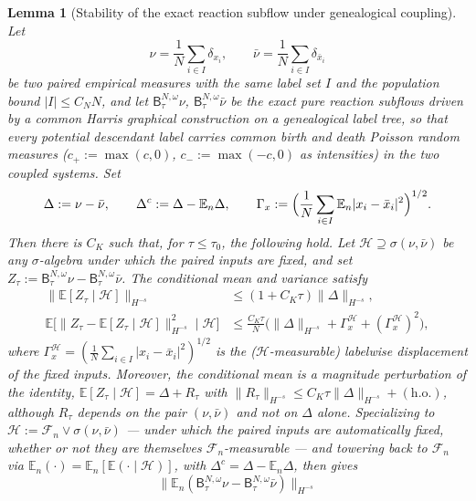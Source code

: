 \documentclass[a4paper,fleqn]{cas-sc}
\newtheorem{lemma}[theorem]{Lemma}
\theoremstyle{definition}
\theoremstyle{remark}
\begin{document}
\begin{lemma}[Stability of the exact reaction subflow under genealogical coupling]\label{lem:Bstab}
Let
\[
\nu=\frac1N\sum_{i\in I}\delta_{x_i},
\qquad
\bar\nu=\frac1N\sum_{i\in I}\delta_{\bar x_i}
\]
be two paired empirical measures with the same label set $I$ and the population
bound $|I|\le C_NN$, and let $\mathsf B^{N,\omega}_\tau\nu$,
$\mathsf B^{N,\omega}_\tau\bar\nu$ be the exact pure reaction subflows driven by a
common Harris graphical construction on a genealogical label tree, so that every
potential descendant label carries common birth and death Poisson random measures
($c_+:=\max(c,0)$, $c_-:=\max(-c,0)$ as intensities) in the two coupled systems.
Set
\[
\Delta:=\nu-\bar\nu,\qquad
\Delta^c:=\Delta-\mathbb E_n\Delta,
\qquad
\Gamma_x:=\Bigl(\frac1N\sum_{i\in I}\mathbb E_n|x_i-\bar x_i|^2\Bigr)^{1/2}.
\]
Then there is $C_K$ such that, for $\tau\le\tau_0$, the following hold. Let
$\mathcal H\supseteq\sigma(\nu,\bar\nu)$ be any $\sigma$-algebra under which the
paired inputs are fixed, and set $Z_\tau:=\mathsf B^{N,\omega}_\tau\nu
-\mathsf B^{N,\omega}_\tau\bar\nu$. The conditional mean and variance satisfy
\begin{align}
\bigl\|\mathbb E[Z_\tau\mid\mathcal H]\bigr\|_{H^{-s}}
&\le (1+C_K\tau)\|\Delta\|_{H^{-s}},
\label{eq:Bstab-cond-mean}\\
\mathbb E\bigl[\|Z_\tau-\mathbb E[Z_\tau\mid\mathcal H]\|_{H^{-s}}^2\mid\mathcal H\bigr]
&\le\frac{C_K\tau}{N}\bigl(\|\Delta\|_{H^{-s}}+\Gamma_x^{\mathcal H}+(\Gamma_x^{\mathcal H})^2\bigr),
\label{eq:Bstab-cond-var}
\end{align}
where $\Gamma_x^{\mathcal H}=(\frac1N\sum_{i\in I}|x_i-\bar x_i|^2)^{1/2}$ is the
($\mathcal H$-measurable) labelwise displacement of the fixed inputs. Moreover, the
conditional mean is a magnitude perturbation of the identity,
$\mathbb E[Z_\tau\mid\mathcal H]=\Delta+R_\tau$ with
$\|R_\tau\|_{H^{-s}}\le C_K\tau\|\Delta\|_{H^{-s}}+\mathrm{(h.o.)}$, although $R_\tau$
depends on the pair $(\nu,\bar\nu)$ and not on $\Delta$ alone. Specializing to
$\mathcal H:=\mathcal F_n\vee\sigma(\nu,\bar\nu)$ --- under which the paired inputs are
automatically fixed, whether or not they are themselves $\mathcal F_n$-measurable ---
and towering back to $\mathcal F_n$ via
$\mathbb E_n(\cdot)=\mathbb E_n[\mathbb E(\cdot\mid\mathcal H)]$, with
$\Delta^c=\Delta-\mathbb E_n\Delta$, then gives
\begin{equation}\label{eq:Bstab-mean}
\bigl\|\mathbb E_n(\mathsf B^{N,\omega}_\tau\nu-\mathsf B^{N,\omega}_\tau\bar\nu)\bigr\|_{H^{-s}}

\end{equation}
\end{lemma}
\end{document}
